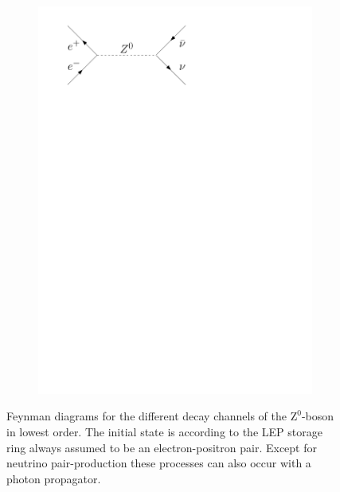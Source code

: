 \documentclass[11pt, a4paper]{article}
\numberwithin{equation}{section}
\begin{document}
\begin{figure}[htb]
\begin{subfigure}{.32\textwidth}
		\includegraphics[width=.9\textwidth]{./figures/theory/feynman/nn}
	\end{subfigure}
	\caption{Feynman diagrams for the different decay channels of the $\mathrm{Z}^0$-boson in lowest order. The initial state is according to the LEP storage ring always assumed to be an electron-positron pair. Except for neutrino pair-production these processes can also occur with a photon propagator.}
	\label{fig:feynman}
\end{figure}
\end{document}
